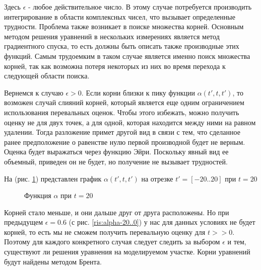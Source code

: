 \documentclass[14pt]{article}
\numberwithin{figure}{section}
\numberwithin{equation}{section}
\newcommand{\sectionbreak}{\clearpage}
\begin{document}
Здесь $\epsilon$ - любое действительное число. В этому случае потребуется производить интегрирование в области комплексных чисел, что вызывает определенные трудности. Проблема также возникает в поиске множества корней. Основным методом решения уравнений в нескольких измерениях является метод градиентного спуска, то есть должны быть описать также производные этих функций. Самым трудоемким в таком случае является именно поиск множества корней, так как возможна потеря некоторых из них во время перехода к следующей области поиска.

Вернемся к случаю $\epsilon > 0$. Если корни близки к пику функции $\alpha(t', t, t')$, то возможен случай слияний корней, который является еще одним ограничением использования перевальных оценок.
Чтобы этого избежать, можно получить оценку не для двух точек, а для одной, которая находится между ними на равном удалении.
Тогда разложение примет другой вид в связи с тем, что сделанное ранее предположение о равенстве нулю первой производной будет не верным. Оценка будет выражаться через функцию Эйри.\cite{spec} Поскольку явный вид ее объемный, приведен он не будет, но получение не вызывает трудностей.

На (рис. \ref{ris:alpha-20..20}) представлен график $\alpha(t', t, t')$ на отрезке $t' = [-20..20]$ при $t = 20$ 

\begin{figure}[h]
	\caption{Функция $\alpha$ при $t = 20$}
	\label{ris:alpha-20..20}
\end{figure}

Корней стало меньше, и они дальше друг от друга расположены. Но при предыдущем $\epsilon = 0.6$ (с рис. \ref{ris:alpha-20..0}) у нас для данных условиях не будет корней, то есть мы не сможем получить перевальную оценку для $t>>0$.
Поэтому для каждого конкретного случая следует следить за выбором $\epsilon$ и тем, существуют ли решения уравнения на моделируемом участке.
Корни уравнений будут найдены методом Брента. \cite{tarasevych}
\sectionbreak
\end{document}
